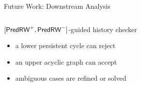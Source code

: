 
\begin{frame}{Future Work: Downstream Analysis}
  \begin{center}
  \end{center}
  \vfill
  \begin{columns}
      \begin{block}{$[\mathsf{PredRW}^{+}, \mathsf{PredRW}^{-}]$-guided history checker}
        \begin{itemize}
          \item a lower persistent cycle can reject
          \item an upper acyclic graph can accept
          \item ambiguous cases are refined or solved
        \end{itemize}
      \end{block}
  \end{columns}
\end{frame}